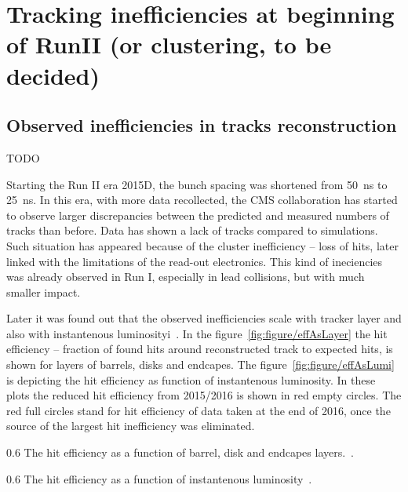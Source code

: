 
\section{Tracking inefficiencies at beginning of RunII (or clustering, to be decided)}

\subsection{Observed inefficiencies in tracks reconstruction}
TODO

Starting the Run II era 2015D, the bunch spacing was shortened from 50~ns to 25~ns. In this era, with more data recollected, the CMS collaboration has started to observe larger discrepancies between the predicted and measured numbers of tracks than before. Data has shown a lack of tracks compared to simulations. Such situation has appeared because of the cluster inefficiency -- loss of hits, later linked with the limitations of the read-out electronics. This kind of ineciencies was already observed in Run I, especially in lead collisions, but with much smaller impact. 

Later it was found out that the observed inefficiencies scale with tracker layer and also with instantenous luminosityi~\cite{website:hitEff}. In the figure~\ref{fig:figure/effAsLayer} the hit efficiency -- fraction of found hits around reconstructed track to expected hits, is shown for layers of barrels, disks and endcapes. The figure~\ref{fig:figure/effAsLumi} is depicting the hit efficiency  as function of instantenous luminosity. In these plots the reduced hit efficiency from 2015/2016 is shown in red empty circles. The red full circles stand for hit efficiency of data taken at the end of 2016, once the source of the largest hit inefficiency was eliminated.


                 {0.6}       %
                 {The hit efficiency as a function of barrel, disk and endcapes layers.~\cite{website:hitEff}.} %

                 {0.6}       %
                 {The hit efficiency as a function of instantenous luminosity~\cite{website:hitEff}.} %

